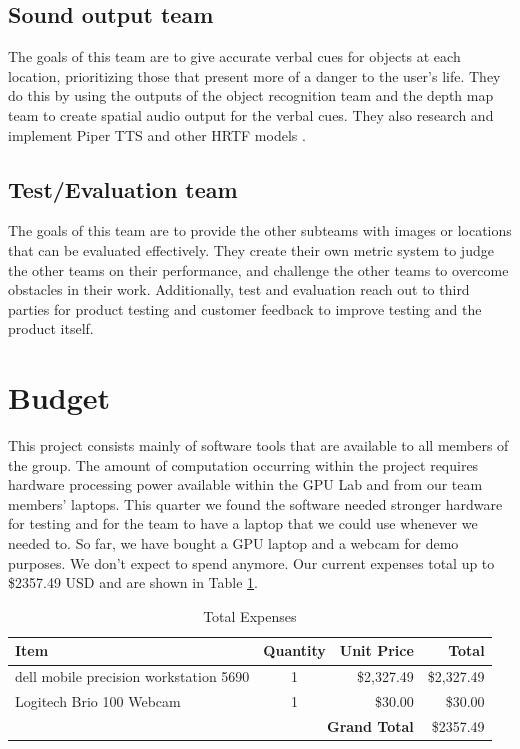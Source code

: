 \documentclass[12pt,a4paper]{article}
\begin{document}
\subsection{Sound output team}
The goals of this team are to give accurate verbal cues for objects at each location, prioritizing those that present more of a danger to the user's life. They do this by using the outputs of the object recognition team and the depth map team to create spatial audio output for the verbal cues. They also research and implement Piper TTS and other HRTF models \cite{rhasspy2024piper}.

\subsection{Test/Evaluation team}
The goals of this team are to provide the other subteams with images or locations that can be evaluated effectively. They create their own metric system to judge the other teams on their performance, and challenge the other teams to overcome obstacles in their work. Additionally, test and evaluation reach out to third parties for product testing and customer feedback to improve testing and the product itself.

\section{Budget}
This project consists mainly of software tools that are available to all members of the group. The amount of computation occurring within the project requires hardware processing power available within the GPU Lab and from our team members' laptops. This quarter we found the software needed stronger hardware for testing and for the team to have a laptop that we could use whenever we needed to. 
So far, we have bought a GPU laptop and a webcam for demo purposes. We don't expect to spend anymore. Our current expenses total up to \$2357.49 USD and are shown in Table \ref{tab:expenses}.

\begin{table}[htbp]
    \centering
    \caption{Total Expenses}
    \label{tab:expenses}
    \begin{tabular}{|l|c|r|r|}
    \hline
    \textbf{Item} & \textbf{Quantity} & \textbf{Unit Price} & \textbf{Total} \\
    \hline
    dell mobile precision workstation 5690  & 1 & \$2,327.49 & \$2,327.49 \\
    \hline
    Logitech Brio 100 Webcam & 1 & \$30.00 & \$30.00 \\
    \hline
    \hline
    \multicolumn{3}{|r|}{\textbf{Grand Total}} & \$2357.49    \\
    \hline
    \end{tabular}
    \end{table}
\end{document}
